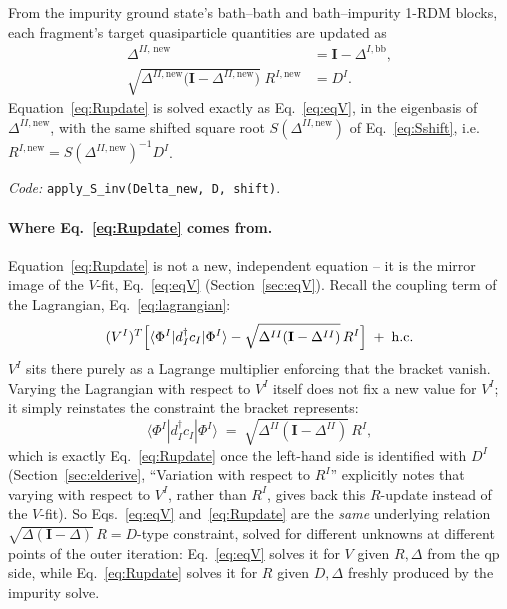 \documentclass[11pt]{article}
\begin{document}
From the impurity ground state's bath--bath and bath--impurity 1-RDM blocks,
each fragment's target quasiparticle quantities are updated as
\begin{align}
  \Delta^{II,\,\mathrm{new}} &= \mathbf{I} - \Delta^{I,\mathrm{bb}}, \label{eq:Deltaupdate}\\
  \sqrt{\Delta^{II,\mathrm{new}}\bigl(\mathbf{I}-\Delta^{II,\mathrm{new}}\bigr)}\;R^{I,\mathrm{new}} &= D^{I}. \label{eq:Rupdate}
\end{align}
Equation~\eqref{eq:Rupdate} is solved exactly as Eq.~\eqref{eq:eqV}, in the
eigenbasis of $\Delta^{II,\mathrm{new}}$, with the same shifted square root
$S(\Delta^{II,\mathrm{new}})$ of Eq.~\eqref{eq:Sshift}, i.e.
$R^{I,\mathrm{new}}=S(\Delta^{II,\mathrm{new}})^{-1}D^{I}$.

\emph{Code:} \texttt{apply\_S\_inv(Delta\_new, D, shift)}.

\paragraph{Where Eq.~\eqref{eq:Rupdate} comes from.} Equation~\eqref{eq:Rupdate}
is not a new, independent equation -- it is the mirror image of the $V$-fit,
Eq.~\eqref{eq:eqV} (Section~\ref{sec:eqV}). Recall the coupling term of the
Lagrangian, Eq.~\eqref{eq:lagrangian}:
\begin{equation}
  (V^I)^{T}\Bigl[\langle\Phi^I|d^{\dagger}_Ic_I|\Phi^I\rangle
     - \sqrt{\Delta^{II}(\mathbf{I}-\Delta^{II})}\,R^{I}\Bigr] \;+\; \mathrm{h.c.}
\end{equation}
$V^I$ sits there purely as a Lagrange multiplier enforcing that the bracket
vanish. Varying the Lagrangian with respect to $V^I$ itself does not fix a
new value for $V^I$; it simply reinstates the constraint the bracket
represents:
\begin{equation}
  \langle\Phi^I|d^{\dagger}_Ic_I|\Phi^I\rangle
  \;=\; \sqrt{\Delta^{II}(\mathbf{I}-\Delta^{II})}\,R^I,
\end{equation}
which is exactly Eq.~\eqref{eq:Rupdate} once the left-hand side is
identified with $D^I$ (Section~\ref{sec:elderive}, ``Variation with respect
to $R^I$'' explicitly notes that varying with respect to $V^I$, rather than
$R^I$, gives back this $R$-update instead of the $V$-fit). So Eqs.~\eqref{eq:eqV}
and~\eqref{eq:Rupdate} are the \emph{same} underlying relation
$\sqrt{\Delta(\mathbf{I}-\Delta)}\,R=D$-type constraint, solved for different
unknowns at different points of the outer iteration: Eq.~\eqref{eq:eqV}
solves it for $V$ given $R,\Delta$ from the qp side, while
Eq.~\eqref{eq:Rupdate} solves it for $R$ given $D,\Delta$ freshly produced by
the impurity solve.
\end{document}
